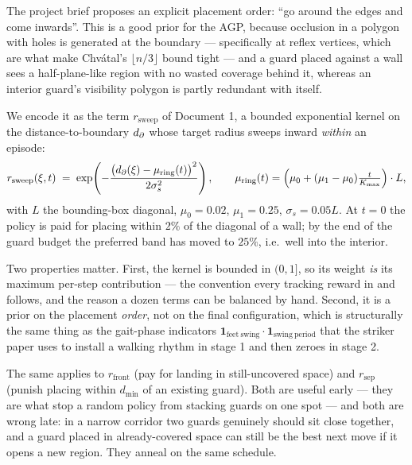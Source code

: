 \documentclass[11pt,a4paper]{article}
\begin{document}
The project brief proposes an explicit placement order: ``go around the edges and come
inwards''. This is a good prior for the AGP, because occlusion in a polygon with holes is
generated at the boundary --- specifically at reflex vertices, which are what make
Chv\'atal's $\lfloor n/3 \rfloor$ bound tight \cite{chvatal1975,fisk1978,orourke1987} --- and a
guard placed against a wall sees a half-plane-like region with no wasted coverage behind it,
whereas an interior guard's visibility polygon is partly redundant with itself.

We encode it as the term $r_{\mathrm{sweep}}$ of Document 1, a bounded exponential kernel on
the distance-to-boundary $d_{\partial}$ whose target radius sweeps inward \emph{within} an episode:
\[
  r_{\mathrm{sweep}}(\xi, t) \;=\;
  \exp\!\left(-\frac{\bigl(d_{\partial}(\xi) - \mu_{\mathrm{ring}}(t)\bigr)^2}{2\sigma_s^2}\right),
  \qquad
  \mu_{\mathrm{ring}}(t) = \Bigl(\mu_0 + (\mu_1-\mu_0)\tfrac{t}{K_{\max}}\Bigr) \cdot L ,
\]
with $L$ the bounding-box diagonal, $\mu_0 = 0.02$, $\mu_1 = 0.25$, $\sigma_s = 0.05 L$.
At $t=0$ the policy is paid for placing within $2\%$ of the diagonal of a wall; by the end
of the guard budget the preferred band has moved to $25\%$, i.e.\ well into the interior.

Two properties matter. First, the kernel is bounded in $(0,1]$, so its weight \emph{is} its
maximum per-step contribution --- the convention every tracking reward in
\citet{wang2025dribble} and \citet{xu2025striker} follows, and the reason a dozen terms can be
balanced by hand. Second, it is a prior on the placement \emph{order}, not on the final
configuration, which is structurally the same thing as the gait-phase indicators
$\mathbf{1}_{\mathrm{feet\ swing}} \cdot \mathbf{1}_{\mathrm{swing\ period}}$ that the striker
paper uses to install a walking rhythm in stage 1 and then zeroes in stage 2.


The same applies to $r_{\mathrm{front}}$ (pay for landing in still-uncovered space) and
$r_{\mathrm{sep}}$ (punish placing within $d_{\min}$ of an existing guard). Both are useful
early --- they are what stop a random policy from stacking guards on one spot --- and both
are wrong late: in a narrow corridor two guards genuinely should sit close together, and a
guard placed in already-covered space can still be the best next move if it opens a new
region. They anneal on the same schedule.
\end{document}

